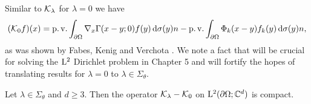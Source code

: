 Similar to $\mathcal{K}_\lambda$ for $\lambda = 0$ we have
\begin{align}
  \label{eq:defnK0}
    (\mathcal{K}_0 f)(x)= \operatorname{p. v.} \int_{\partial\Omega} \nabla_x \Gamma(x - y; 0)  f(y) \, {\operatorname{d}\!{\sigma}}(y) n - \operatorname{p. v.} \int_{\partial\Omega} \Phi_k(x - y) f_k(y) \, {\operatorname{d}\!{\sigma}}(y) n,
\end{align}
as was shown by Fabes, Kenig and Verchota \cite[(0.12)]{fabesKenigVerchota}.
We note a fact that will be crucial for solving the $\mathrm{L}^2$ Dirichlet problem in Chapter 5 and will fortify the hopes of translating results for $\lambda = 0$ to $\lambda \in \Sigma_\theta$.
\begin{lem}
  \label{lem:compactness}
  Let $\lambda \in \Sigma_\theta$ and $d \geq 3$.
  Then the operator $\mathcal{K}_\lambda - \mathcal{K}_0$ on $\mathrm{L}^2(\partial\Omega; \mathbb{C}^d)$ is compact.
\end{lem}

